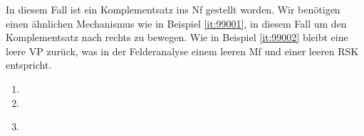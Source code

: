 \begin{enumerate}
    In diesem Fall ist ein Komplementsatz ins Nf gestellt worden.
    Wir benötigen einen ähnlichen Mechanismus wie in Beispiel \ref{it:99001}, in diesem Fall um den Komplementsatz nach rechts zu bewegen.
    Wie in Beispiel \ref{it:99002} bleibt eine leere VP zurück, was in der Felderanalyse einem leeren Mf und einer leeren RSK entspricht.
\end{enumerate}


\begin{enumerate}
  \item
  \item
  \item
    \resizebox{0.9\textwidth}{!}
    {
    }
\end{enumerate}

